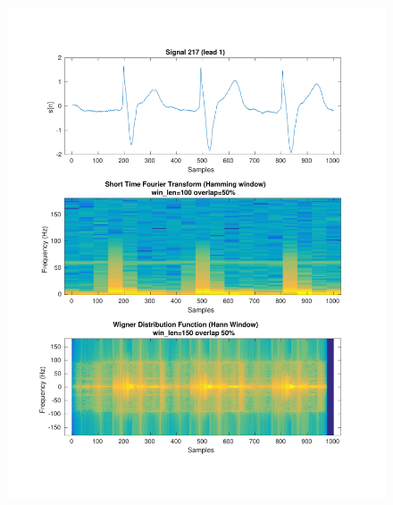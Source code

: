 \documentclass[11pt,a4paper]{article}
\begin{document}
\begin{figure}[H]
\centering
\begin{minipage}{0.48\textwidth}
	\centering
	\includegraphics[width=\textwidth]{fig/217l1_stft_wdf.pdf}
	

\end{minipage}
\end{figure}
\end{document}
